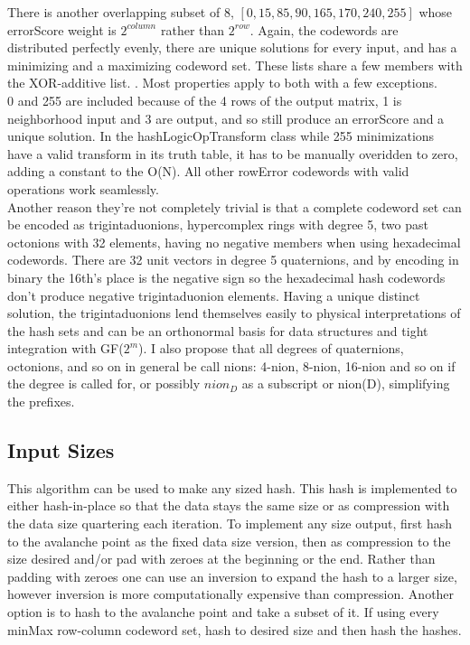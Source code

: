 \documentclass[11pt]{article}
\begin{document}
There is another overlapping subset of 8, $[0,15,85,90,165,170,240,255]$ whose errorScore weight is $2^{column}$ rather than $2^{row}$. Again, the codewords are distributed perfectly evenly, there are unique solutions for every input, and has a minimizing and a maximizing codeword set. These lists share a few members with the XOR-additive list. \cite{xorAdditive}. Most properties apply to both with a few exceptions.\\

0 and 255 are included because of the 4 rows of the output matrix, 1 is neighborhood input and 3 are output, and so still produce an errorScore and a unique solution. In the hashLogicOpTransform class while 255 minimizations have a valid transform in its truth table, it has to be manually overidden to zero, adding a constant to the O(N). All other rowError codewords with valid operations work seamlessly. \\

Another reason they're not completely trivial is that a complete codeword set can be encoded as trigintaduonions, hypercomplex rings with degree 5, two past octonions with 32 elements, having no negative members when using hexadecimal codewords.  There are 32 unit vectors in degree 5 quaternions, and by encoding in binary the 16th's place is the negative sign so the hexadecimal hash codewords don't produce negative trigintaduonion elements. Having a unique distinct solution, the trigintaduonions lend themselves easily to physical interpretations of the hash sets and can be an orthonormal basis for data structures and tight integration with GF($2^m$). I also propose that all degrees of quaternions, octonions, and so on in general be call nions: 4-nion, 8-nion, 16-nion and so on if the degree is called for, or possibly $nion_D$ as a subscript or nion(D), simplifying the prefixes.\\

\subsection{Input Sizes}
This algorithm can be used to make any sized hash. This hash is implemented to either hash-in-place so that the data stays the same size or as compression with the data size quartering each iteration. To implement any size output, first hash to the avalanche point as the fixed data size version, then as compression to the size desired and/or pad with zeroes at the beginning or the end. Rather than padding with zeroes one can use an inversion to expand the hash to a larger size, however inversion is more computationally expensive than compression. Another option is to hash to the avalanche point and take a subset of it. If using every minMax row-column codeword set, hash to desired size and then hash the hashes.\\
\end{document}
